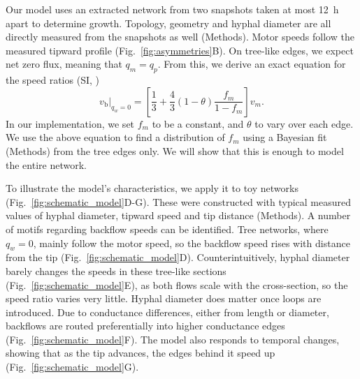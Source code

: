 Our model uses an extracted network from two snapshots taken at most 12~h apart to determine growth. Topology, geometry and hyphal diameter are all directly measured from the snapshots as well (Methods). Motor speeds follow the measured tipward profile (Fig.~\ref{fig:asymmetries}B). On tree-like edges, we expect net zero flux, meaning that $q_m = q_p$. From this, we derive an exact equation for the speed ratios (SI, )
\begin{equation}
\label{eq:tree_backflow_speed}
v_\mathrm{b}\big|_{q_w = 0} = \left[\frac{1}{3} + \frac{4}{3}(1-\theta)\frac{f_m}{1-f_m}\right] v_m.
\end{equation}
In our implementation, we set $f_m$ to be a constant, and $\theta$ to vary over each edge. We use the above equation to find a distribution of $f_m$ using a Bayesian fit (Methods) from the tree edges only. We will show that this is enough to model the entire network.

To illustrate the model's characteristics, we apply it to toy networks (Fig.~\ref{fig:schematic_model}D-G). These were constructed with typical measured values of hyphal diameter, tipward speed and tip distance (Methods). A number of motifs regarding backflow speeds can be identified. Tree networks, where $q_w = 0$, mainly follow the motor speed, so the backflow speed rises with distance from the tip (Fig.~\ref{fig:schematic_model}D).
Counterintuitively, hyphal diameter barely changes the speeds in these tree-like sections (Fig.~\ref{fig:schematic_model}E), as both flows scale with the cross-section, so the speed ratio varies very little. Hyphal diameter does matter once loops are introduced. Due to conductance differences, either from length or diameter, backflows are routed preferentially into higher conductance edges (Fig.~\ref{fig:schematic_model}F). The model also responds to temporal changes, showing that as the tip advances, the edges behind it speed up (Fig.~\ref{fig:schematic_model}G).


